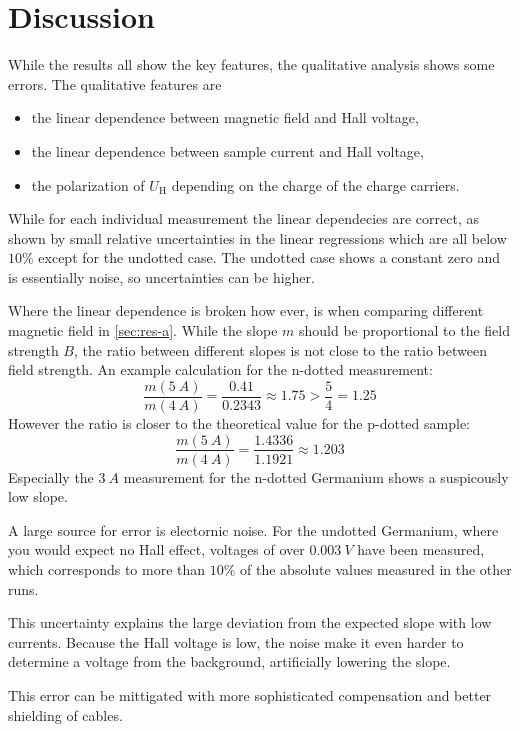 \section{Discussion}
\label{sec:discussion}
While the results all show the key features, the qualitative analysis shows some errors. The
qualitative features are
\begin{itemize}
  \item the linear dependence between magnetic field and Hall voltage,
  \item the linear dependence between sample current and Hall voltage,
  \item the polarization of $U_\text{H}$ depending on the charge of the charge carriers.
\end{itemize}
While for each individual measurement the linear dependecies are correct, as shown by small
relative uncertainties in the linear regressions which are all below $10\%$ except for the undotted
case. The undotted case shows a constant zero and is essentially noise, so uncertainties can be
higher.

Where the linear dependence is broken how ever, is when comparing different magnetic field in
\autoref{sec:res-a}. While the slope $m$ should be proportional to the field strength $B$, the
ratio between different slopes is not close to the ratio between field strength. An example
calculation for the n-dotted measurement:
\begin{equation}
  \frac{m(\SI{5}{A})}{m(\SI{4}{A})} = \frac{0.41}{0.2343} \approx 1.75 > \frac{5}{4} = 1.25
\end{equation}
However the ratio is closer to the theoretical value for the p-dotted sample:
\begin{equation}
  \frac{m(\SI{5}{A})}{m(\SI{4}{A})} = \frac{1.4336}{1.1921} \approx 1.203
\end{equation}
Especially the $\SI{3}{A}$ measurement for the n-dotted Germanium shows a suspicously low slope.

A large source for error is electornic noise. For the undotted Germanium, where you would expect no
Hall effect, voltages of over $\SI{0.003}{V}$ have been measured, which corresponds to more than
$10\%$ of the absolute values measured in the other runs. 

This uncertainty explains the large deviation from the expected slope with low currents. Because the
Hall voltage is low, the noise make it even harder to determine a voltage from the background,
artificially lowering the slope.

This error can be mittigated with more sophisticated compensation and better shielding of cables.

